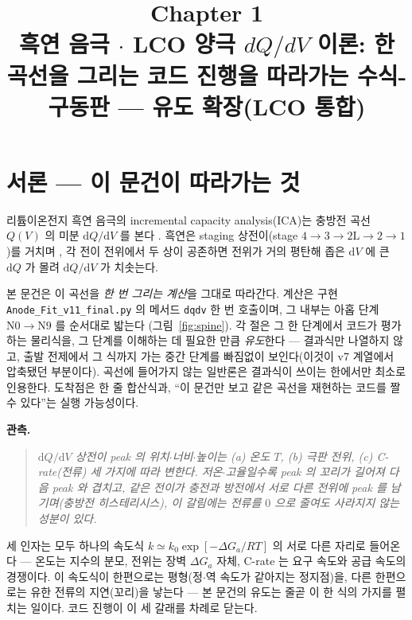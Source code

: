 \documentclass[11pt,a4paper]{article}
\title{\textbf{\LARGE Chapter 1}\\[0.35em]\Large 흑연 음극 $\cdot$ LCO 양극 $dQ/dV$ 이론: 한 곡선을 그리는 코드 진행을 따라가는 수식-구동판 — 유도 확장(LCO 통합)}
\author{}
\date{}
\newcommand{\dd}{\mathrm{d}}
\newcommand{\code}[1]{\texttt{#1}}
\begin{document}
\maketitle

\section*{서론 — 이 문건이 따라가는 것}
리튬이온전지 흑연 음극의 incremental capacity analysis(ICA)는 충방전 곡선 $Q(V)$ 의 미분
$\dd Q/\dd V$ 를 본다 \cite{bloom2005,dubarry2012}. 흑연은 staging 상전이(stage
$4\!\to\!3\!\to\!2\mathrm L\!\to\!2\!\to\!1$)를 거치며 \cite{dahn1991,ohzuku1993}, 각 전이 전위에서
두 상이 공존하면 전위가 거의 평탄해 좁은 $\dd V$ 에 큰 $\dd Q$ 가 몰려 $\dd Q/\dd V$ 가 치솟는다.

본 문건은 이 곡선을 \emph{한 번 그리는 계산}을 그대로 따라간다. 계산은 구현 \code{Anode\_Fit\_v11\_final.py}
의 메서드 \code{dqdv} 한 번 호출이며, 그 내부는 아홉 단계 $\mathrm N0\!\to\!\mathrm N9$ 를 순서대로 밟는다
(그림~\ref{fig:spine}). 각 절은 그 한 단계에서 코드가 평가하는 물리식을, 그 단계를 이해하는 데 필요한 만큼
\emph{유도}한다 — 결과식만 나열하지 않고, 출발 전제에서 그 식까지 가는 중간 단계를 빠짐없이 보인다(이것이 v7
계열에서 압축됐던 부분이다). 곡선에 들어가지 않는 일반론은 결과식이 쓰이는 한에서만 최소로 인용한다. 도착점은 한 줄
합산식과, ``이 문건만 보고 같은 곡선을 재현하는 코드를 짤 수 있다''는 실행 가능성이다.

\textbf{관측.}
\begin{quote}\itshape
$\dd Q/\dd V$ 상전이 peak 의 위치$\cdot$너비$\cdot$높이는 (a) 온도 $T$, (b) 극판 전위, (c) C-rate(전류)
세 가지에 따라 변한다. 저온$\cdot$고율일수록 peak 의 꼬리가 길어져 다음 peak 와 겹치고, 같은 전이가 충전과 방전에서
서로 다른 전위에 peak 를 남기며(충방전 히스테리시스), 이 갈림에는 전류를 $0$ 으로 줄여도 사라지지 않는 성분이 있다.
\end{quote}

세 인자는 모두 하나의 속도식 $k\simeq k_0\exp[-\Delta G_a/RT]$ 의 서로 다른 자리로 들어온다 — 온도는 지수의 분모,
전위는 장벽 $\Delta G_a$ 자체, C-rate 는 요구 속도와 공급 속도의 경쟁이다. 이 속도식이 한편으로는 평형(정$\cdot$역
속도가 같아지는 정지점)을, 다른 한편으로는 유한 전류의 지연(꼬리)을 낳는다 — 본 문건의 유도는 줄곧 이 한 식의 가지를
펼치는 일이다. 코드 진행이 이 세 갈래를 차례로 닫는다.
\end{document}
